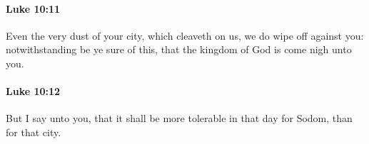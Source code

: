 		\paragraph{Luke 10:11} %
			\label{LUKE-10-11}

			Even the very dust of your city, which cleaveth on us, we do wipe off against you: notwithstanding be ye sure of this, that the kingdom of God is come nigh unto you.

			\begin{framed}
			\scriptsize
				\begin{compactdesc}
					\item[SBLG] 
				\end{compactdesc}
			\end{framed}

		\paragraph{Luke 10:12} %
			\label{LUKE-10-12}

			But I say unto you, that it shall be more tolerable in that day for Sodom, than for that city.

